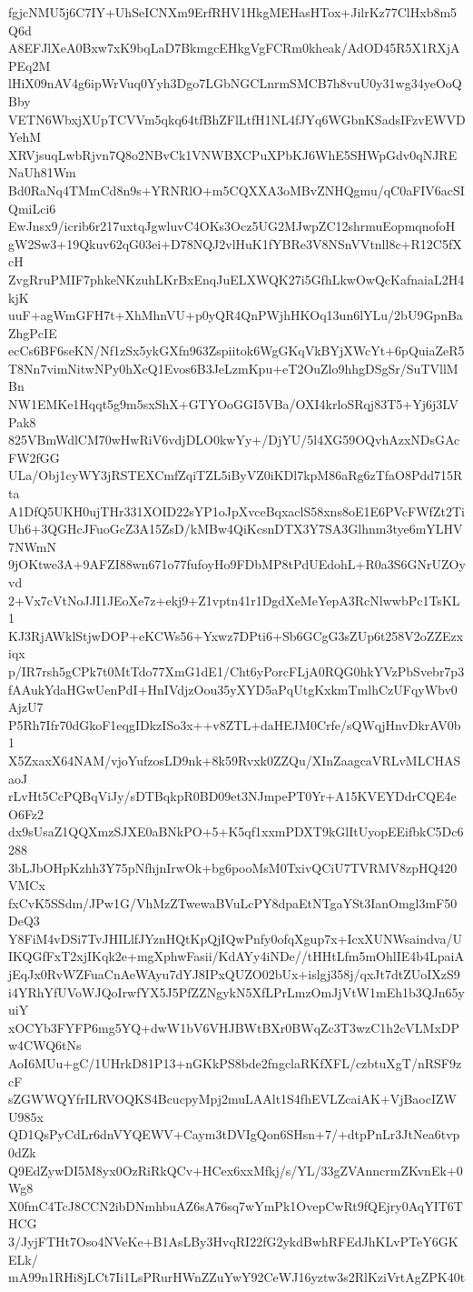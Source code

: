 fgjcNMU5j6C7IY+UhSeICNXm9ErfRHV1HkgMEHasHTox+JilrKz77ClHxb8m5Q6d
A8EFJlXeA0Bxw7xK9bqLaD7BkmgcEHkgVgFCRm0kheak/AdOD45R5X1RXjAPEq2M
lHiX09nAV4g6ipWrVuq0Yyh3Dgo7LGbNGCLnrmSMCB7h8vuU0y31wg34yeOoQBby
VETN6WbxjXUpTCVVm5qkq64tfBhZFlLtfH1NL4fJYq6WGbnKSadsIFzvEWVDYehM
XRVjsuqLwbRjvn7Q8o2NBvCk1VNWBXCPuXPbKJ6WhE5SHWpGdv0qNJRENaUh81Wm
Bd0RaNq4TMmCd8n9s+YRNRlO+m5CQXXA3oMBvZNHQgmu/qC0aFIV6acSIQmiLci6
EwJnsx9/icrib6r217uxtqJgwluvC4OKs3Ocz5UG2MJwpZC12shrmuEopmqnofoH
gW2Sw3+19Qkuv62qG03ei+D78NQJ2vlHuK1fYBRe3V8NSnVVtnll8c+R12C5fXcH
ZvgRruPMIF7phkeNKzuhLKrBxEnqJuELXWQK27i5GfhLkwOwQcKafnaiaL2H4kjK
uuF+agWmGFH7t+XhMhnVU+p0yQR4QnPWjhHKOq13un6lYLu/2bU9GpnBaZhgPcIE
ecCs6BF6seKN/Nf1zSx5ykGXfn963Zspiitok6WgGKqVkBYjXWcYt+6pQuiaZeR5
T8Nn7vimNitwNPy0hXcQ1Evos6B3JeLzmKpu+eT2OuZlo9hhgDSgSr/SuTVllMBn
NW1EMKe1Hqqt5g9m5sxShX+GTYOoGGI5VBa/OXI4krloSRqj83T5+Yj6j3LVPak8
825VBmWdlCM70wHwRiV6vdjDLO0kwYy+/DjYU/5l4XG59OQvhAzxNDsGAcFW2fGG
ULa/Obj1cyWY3jRSTEXCmfZqiTZL5iByVZ0iKDl7kpM86aRg6zTfaO8Pdd715Rta
A1DfQ5UKH0ujTHr331XOID22sYP1oJpXvceBqxaclS58xns8oE1E6PVcFWfZt2Ti
Uh6+3QGHcJFuoGcZ3A15ZsD/kMBw4QiKcsnDTX3Y7SA3Glhnm3tye6mYLHV7NWmN
9jOKtwe3A+9AFZI88wn671o77fufoyHo9FDbMP8tPdUEdohL+R0a3S6GNrUZOyvd
2+Vx7cVtNoJJI1JEoXe7z+ekj9+Z1vptn41r1DgdXeMeYepA3RcNlwwbPc1TsKL1
KJ3RjAWklStjwDOP+eKCWs56+Yxwz7DPti6+Sb6GCgG3sZUp6t258V2oZZEzxiqx
p/IR7rsh5gCPk7t0MtTdo77XmG1dE1/Cht6yPorcFLjA0RQG0hkYVzPbSvebr7p3
fAAukYdaHGwUenPdI+HnIVdjzOou35yXYD5aPqUtgKxkmTmlhCzUFqyWbv0AjzU7
P5Rh7Ifr70dGkoF1eqgIDkzISo3x++v8ZTL+daHEJM0Crfe/sQWqjHnvDkrAV0b1
X5ZxaxX64NAM/vjoYufzosLD9nk+8k59Rvxk0ZZQu/XInZaagcaVRLvMLCHASaoJ
rLvHt5CcPQBqViJy/sDTBqkpR0BD09et3NJmpePT0Yr+A15KVEYDdrCQE4eO6Fz2
dx9sUsaZ1QQXmzSJXE0aBNkPO+5+K5qf1xxmPDXT9kGlItUyopEEifbkC5Dc6288
3bLJbOHpKzhh3Y75pNfhjnIrwOk+bg6pooMsM0TxivQCiU7TVRMV8zpHQ420VMCx
fxCvK5SSdm/JPw1G/VhMzZTwewaBVuLcPY8dpaEtNTgaYSt3IanOmgl3mF50DeQ3
Y8FiM4vDSi7TvJHILlfJYznHQtKpQjIQwPnfy0ofqXgup7x+IcxXUNWsaindva/U
IKQGfFxT2xjIKqk2e+mgXphwFasii/KdAYy4iNDe//tHHtLfm5mOhlIE4b4LpaiA
jEqJx0RvWZFuaCnAeWAyu7dYJ8IPxQUZO02bUx+islgj358j/qxJt7dtZUoIXzS9
i4YRhYfUVoWJQoIrwfYX5J5PfZZNgykN5XfLPrLmzOmJjVtW1mEh1b3QJn65yuiY
xOCYb3FYFP6mg5YQ+dwW1bV6VHJBWtBXr0BWqZc3T3wzC1h2cVLMxDPw4CWQ6tNs
AoI6MUu+gC/1UHrkD81P13+nGKkPS8bde2fngclaRKfXFL/czbtuXgT/nRSF9zcF
sZGWWQYfrILRVOQKS4BcucpyMpj2muLAAlt1S4fhEVLZcaiAK+VjBaocIZWU985x
QD1QsPyCdLr6dnVYQEWV+Caym3tDVIgQon6SHsn+7/+dtpPnLr3JtNea6tvp0dZk
Q9EdZywDI5M8yx0OzRiRkQCv+HCex6xxMfkj/s/YL/33gZVAnncrmZKvnEk+0Wg8
X0fmC4TcJ8CCN2ibDNmhbuAZ6sA76sq7wYmPk1OvepCwRt9fQEjry0AqYIT6THCG
3/JyjFTHt7Oso4NVeKe+B1AsLBy3HvqRI22fG2ykdBwhRFEdJhKLvPTeY6GKELk/
mA99n1RHi8jLCt7Ii1LsPRurHWnZZuYwY92CeWJ16yztw3s2RlKziVrtAgZPK40t
